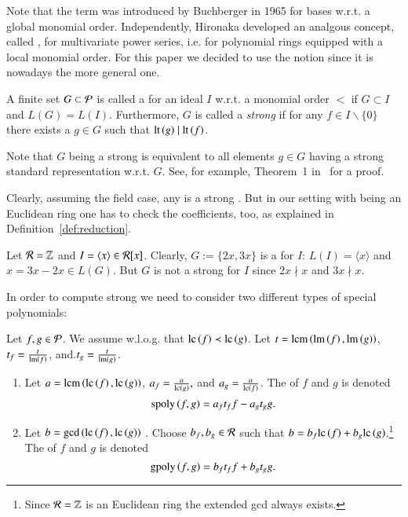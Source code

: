 \begin{convention}
Note that the term \emph{\gb} was introduced by Buchberger in 1965 for bases
w.r.t. a global monomial order. Independently, Hironaka developed an analgous
concept, called \emph{\stb}, for multivariate power series, i.e. for polynomial
rings equipped with a local monomial order. For this paper we decided to use
the notion \emph{\stb} since it is nowadays the more general one.
\end{convention}

\begin{definition}
\label{def:strong-sb}
A finite set $G \subset \mathcal{P}$ is called a \emph{\stb} for an ideal $I$ w.r.t.
a monomial order $<$ if $G \subset I$ and $L(G) = L(I)$. Furthermore, $G$ is called a
\emph{strong \stb}
   if for any $f \in I\backslash\{0\}$ there exists a $g\in G$
such that $\operatorname{lt}\left({g}\right) \mid \operatorname{lt}\left({f}\right)$. 
\end{definition}

\begin{remark}
Note that $G$ being a strong \stb is equivalent to all elements $g \in G$ having
a strong standard representation w.r.t. $G$. See, for
example, Theorem~1 in~\cite{lichtblau2012} for a proof.
\end{remark}

Clearly, assuming the field case, any \stb is a strong \stb. But in our setting
with \er being an Euclidean ring one has to check the coefficients, too, as
explained in Definition~\ref{def:reduction}.

\begin{example}
\label{ex:stronggb}
Let $\mathcal{R} = \mathbb{Z}$ and $I= \langle x \rangle \in \mathcal{R}[x]$. Clearly, $G :=
\{2x,3x\}$ is a \stb for $I$: $L(I) = \langle x \rangle$ and $x = 3x-2x \in
L(G)$. But $G$ is not a strong \stb for $I$ since $2x \nmid
x$ and $3x \nmid x$.
\end{example}

In order to compute strong \stbs we need to consider two different types of
special polynomials:

\begin{definition}
\label{def:spoly}
Let $f,g \in \mathcal{P}$. We assume w.l.o.g. that $\mathrm{lc}\left({f}\right) \prec \mathrm{lc}\left({g}\right)$.
Let $t = \operatorname{lcm}\left(\operatorname{lm}\left({f}\right), \operatorname{lm}\left({g}\right)\right)$, $t_f = \frac{t}{\operatorname{lm}\left({f}\right)}$, and.$t_g = \frac{t}{\operatorname{lm}\left({g}\right)}$.
\begin{enumerate}
\item Let $a = \operatorname{lcm}\left(\mathrm{lc}\left({f}\right), \mathrm{lc}\left({g}\right)\right)$, $a_f = \frac{a}{\mathrm{lc}\left({g}\right)},$ and $a_g =
\frac{a}{\mathrm{lc}\left({f}\right)}$. The \emph{\spt} of $f$ and $g$ is denoted 
\[\mathrm{spoly}\left({f},{g}\right) = a_f t_f f - a_g t_g g.\]
\item Let $b = \gcd\left(\mathrm{lc}\left({f}\right), \mathrm{lc}\left({g}\right)\right)$ . Choose $b_f, b_g \in \mathcal{R}$ such that $b = b_f \mathrm{lc}\left({f}\right) + b_g \mathrm{lc}\left({g}\right)$.\footnote{Since $\mathcal{R} = \mathbb{Z}$ is an Euclidean ring the extended gcd always exists.}
The \emph{\gpt} of $f$ and $g$ is denoted 
\[\mathrm{gpoly}\left({f},{g}\right) = b_f t_f f + b_g t_g g.\]
\end{enumerate}
\end{definition}

